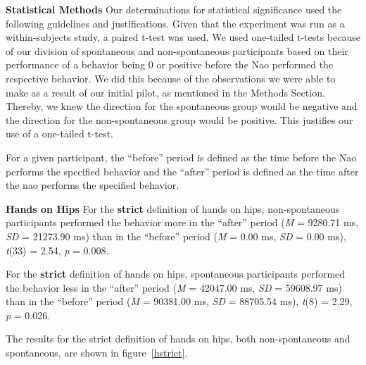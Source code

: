 \documentclass{acm_proc_article-sp}
\begin{document}
\textbf{Statistical Methods} Our determinations for statistical significance used the following guidelines and justifications. 
Given that the experiment was run as a within-subjects study, a paired t-test was used. We used one-tailed t-tests because of our division of spontaneous and non-spontaneous participants based on their performance of a behavior being 0 or positive before the Nao performed the respective behavior. We did this because of the observations we were able to make as a result of our initial pilot, as mentioned in the Methods Section. Thereby, we knew the direction for the spontaneous group would be negative and the direction for the non-spontaneous group would be positive. This justifies our use of a one-tailed t-test. 

For a given participant, the ``before'' period is defined as the time before the Nao performs the specified behavior and the ``after'' period is defined as the time after the nao performs the specified behavior.

\textbf{Hands on Hips} 
For the \textbf{strict} definition of hands on hips, non-spontaneous participants performed the behavior more in the ``after'' period (\textit{M} = 9280.71 ms, \textit{SD} = 21273.90 ms) than in the ``before'' period (\textit{M} = 0.00 ms, \textit{SD} = 0.00 ms), \textit{t}(33) = 2.54, \textit{p} = 0.008.

For the \textbf{strict} definition of hands on hips, spontaneous participants performed the behavior less in the ``after'' period (\textit{M} = 42047.00 ms, \textit{SD} = 59608.97 ms) than in the ``before'' period (\textit{M} = 90381.00 ms, \textit{SD} = 88705.54 ms), \textit{t}(8) = 2.29, \textit{p} = 0.026.

The results for the strict definition of hands on hips, both non-spontaneous and spontaneous, are shown in figure~\ref{hstrict}.
\end{document}
